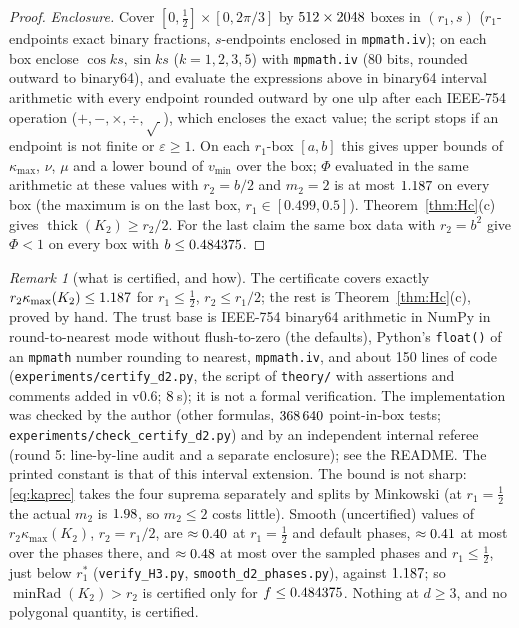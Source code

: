 \documentclass[10pt,a4paper]{article}
\theoremstyle{plain}
\theoremstyle{definition}
\theoremstyle{remark}
\newtheorem{remark}[theorem]{Remark}
\newcommand{\thick}{\operatorname{thick}}
\newcommand{\minRad}{\operatorname{minRad}}
\begin{document}
\begin{proof}
\emph{Enclosure.} Cover $[0,\frac12]\times[0,2\pi/3]$ by $512\times2048$ boxes in $(r_1,s)$ ($r_1$-endpoints exact binary fractions, $s$-endpoints enclosed in \texttt{mpmath.iv}); on each box enclose $\cos ks,\sin ks$ ($k=1,2,3,5$) with \texttt{mpmath.iv} (80 bits, rounded outward to binary64), and evaluate the expressions above in binary64 interval arithmetic with every endpoint rounded outward by one ulp after each IEEE-754 operation ($+,-,\times,\div,\sqrt{\ }$), which encloses the exact value; the script stops if an endpoint is not finite or $\varepsilon\ge1$. On each $r_1$-box $[a,b]$ this gives upper bounds of $\kappa_{\max}$, $\nu$, $\mu$ and a lower bound of $v_{\min}$ over the box; $\Phi$ evaluated in the same arithmetic at these values with $r_2=b/2$ and $m_2=2$ is at most $1.187$ on every box (the maximum is on the last box, $r_1\in[0.499,0.5]$). Theorem~\ref{thm:Hc}(c) gives $\thick(K_2)\ge r_2/2$. For the last claim the same box data with $r_2=b^2$ give $\Phi<1$ on every box with $b\le0.484375$.
\end{proof}

\begin{remark}[what is certified, and how]\label{rem:d2method}
The certificate covers exactly $r_2\kappa_{\max}(K_2)\le1.187$ for $r_1\le\frac12$, $r_2\le r_1/2$; the rest is Theorem~\ref{thm:Hc}(c), proved by hand. The trust base is IEEE-754 binary64 arithmetic in NumPy in round-to-nearest mode without flush-to-zero (the defaults), Python's \texttt{float()} of an \texttt{mpmath} number rounding to nearest, \texttt{mpmath.iv}, and about 150 lines of code (\texttt{experiments/certify\_d2.py}, the script of \texttt{theory/} with assertions and comments added in v0.6; $8$\,s); it is not a formal verification. The implementation was checked by the author (other formulas, $368\,640$ point-in-box tests; \texttt{experiments/check\_certify\_d2.py}) and by an independent internal referee (round 5: line-by-line audit and a separate enclosure); see the README. The printed constant is that of this interval extension. The bound is not sharp: \eqref{eq:kaprec} takes the four suprema separately and splits by Minkowski (at $r_1=\frac12$ the actual $m_2$ is $1.98$, so $m_2\le2$ costs little). Smooth (uncertified) values of $r_2\kappa_{\max}(K_2)$, $r_2=r_1/2$, are $\approx0.40$ at $r_1=\frac12$ and default phases, $\approx0.41$ at most over the phases there, and $\approx0.48$ at most over the sampled phases and $r_1\le\frac12$, just below $r_1^\ast$ (\texttt{verify\_H3.py}, \texttt{smooth\_d2\_phases.py}), against $1.187$; so $\minRad(K_2)>r_2$ is certified only for $f\le0.484375$. Nothing at $d\ge3$, and no polygonal quantity, is certified.
\end{remark}
\end{document}
